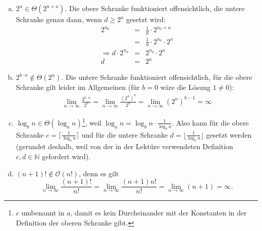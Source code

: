 \documentclass[11pt]{article} %
\theoremstyle{definition}
\begin{document}
\begin{enumerate}[(a)]

\item $2^n \in \Theta(2^{n+a})$. Die obere Schranke funktioniert offensichtlich, die untere Schranke genau dann, wenn $d \ge 2^a$ gesetzt wird:
\begin{eqnarray*}
2^{n_0} &=& \frac{1}{d} \cdot 2^{n_0 + a} \\
&=& \frac{1}{d} \cdot 2^{n_0}\cdot 2^a\\
\Rightarrow d\cdot 2^{n_0} &=& 2^{n_0}\cdot 2^a \\
d &=& 2^a
\end{eqnarray*}

\item $2^{b\cdot n} \notin \Theta(2^n)$. Die untere Schranke funktioniert offensichtlich, für die obere Schranke gilt leider im Allgemeinen (für $b = 0$ wäre die Lösung $1 \neq 0$):
\begin{eqnarray*}
\lim_{n \rightarrow \infty} \frac{2^{b\cdot n}}{2^n} = \lim_{n \rightarrow \infty} \frac{\left(2^n\right)^b}{2^n} = \lim_{n \rightarrow \infty} \left(2^n\right)^{b-1} = \infty
\end{eqnarray*}

\item $\log_b n \in \Theta(\log_a n)$\footnote{$c$ umbenannt in $a$, damit es kein Durcheinander mit der Konstanten in der Definition der oberen Schranke gibt.}, weil $\log_a n = \log_b n \cdot \frac 1 {\log_b a}$. Also kann für die obere Schranke $c  = \lceil\frac 1 {\log_b a} \rceil$ und für die untere Schranke $d = \lfloor\frac 1 {\log_b a} \rfloor$ gesetzt werden (gerundet deshalb, weil von der in der Lektüre verwendeten Definition $c, d \in \mathbb{N}$ gefordert wird).

\item $(n+1)! \notin \mathcal{O}(n!)$, denn es gilt
\[
\lim_{n \rightarrow \infty} \frac{(n+1)!}{n!} = \lim_{n \rightarrow \infty} \frac{(n+1)n!}{n!} = \lim_{n \rightarrow \infty} (n+1) = \infty.
\]

\end{enumerate}
\end{document}
